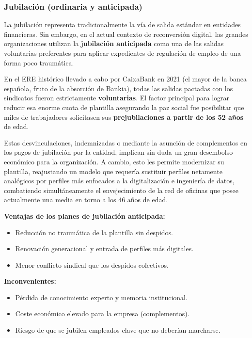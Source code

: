 \subsubsection{Jubilación (ordinaria y anticipada)}

La jubilación representa tradicionalmente la vía de salida estándar en entidades financieras. Sin embargo, en el actual contexto de reconversión digital, las grandes organizaciones utilizan la \textbf{jubilación anticipada} como una de las salidas voluntarias preferentes para aplicar expedientes de regulación de empleo de una forma poco traumática.

En el ERE histórico llevado a cabo por CaixaBank en 2021 (el mayor de la banca española, fruto de la absorción de Bankia), todas las salidas pactadas con los sindicatos fueron estrictamente \textbf{voluntarias}. El factor principal para lograr reducir esa enorme cuota de plantilla asegurando la paz social fue posibilitar que miles de trabajadores solicitasen sus \textbf{prejubilaciones a partir de los 52 años} de edad.

Estas desvinculaciones, indemnizadas o mediante la asunción de complementos en los pagos de jubilación por la entidad, implican sin duda un gran desembolso económico para la organización. A cambio, esto les permite modernizar su plantilla, reajustando un modelo que requería sustituir perfiles netamente analógicos por perfiles más enfocados a la digitalización e ingeniería de datos, combatiendo simultáneamente el envejecimiento de la red de oficinas que posee actualmente una media en torno a los 46 años de edad.

\textbf{Ventajas de los planes de jubilación anticipada:}
\begin{itemize}
  \item Reducción no traumática de la plantilla sin despidos.
  \item Renovación generacional y entrada de perfiles más digitales.
  \item Menor conflicto sindical que los despidos colectivos.
\end{itemize}

\textbf{Inconvenientes:}
\begin{itemize}
  \item Pérdida de conocimiento experto y memoria institucional.
  \item Coste económico elevado para la empresa (complementos).
  \item Riesgo de que se jubilen empleados clave que no deberían marcharse.
\end{itemize}

